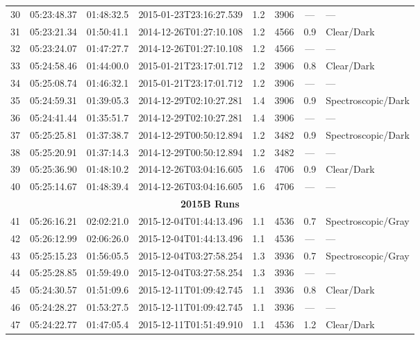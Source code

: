\documentclass[12pt]{article}
\begin{document}
\begin{table}
\begin{center}
\begin{threeparttable}
\begin{tabular}{lccccccl}
	30 & 05:23:48.37 & 01:48:32.5 & 2015-01-23T23:16:27.539 & 1.2  & 3906 & ---      & ---                 \\
	31 & 05:23:21.34 & 01:50:41.1 & 2014-12-26T01:27:10.108 & 1.2  & 4566 & 0.9      & Clear/Dark          \\
	32 & 05:23:24.07 & 01:47:27.7 & 2014-12-26T01:27:10.108 & 1.2  & 4566 & ---      & ---                 \\
	33 & 05:24:58.46 & 01:44:00.0 & 2015-01-21T23:17:01.712 & 1.2  & 3906 & 0.8      & Clear/Dark          \\
	34 & 05:25:08.74 & 01:46:32.1 & 2015-01-21T23:17:01.712 & 1.2  & 3906 & ---      & ---                 \\
	35 & 05:24:59.31 & 01:39:05.3 & 2014-12-29T02:10:27.281 & 1.4  & 3906 & 0.9      & Spectroscopic/Dark  \\
	36 & 05:24:41.44 & 01:35:51.7 & 2014-12-29T02:10:27.281 & 1.4  & 3906 & ---      & ---                 \\
	37 & 05:25:25.81 & 01:37:38.7 & 2014-12-29T00:50:12.894 & 1.2  & 3482 & 0.9      & Spectroscopic/Dark  \\
	38 & 05:25:20.91 & 01:37:14.3 & 2014-12-29T00:50:12.894 & 1.2  & 3482 & ---      & ---                 \\
	39 & 05:25:36.90 & 01:48:10.2 & 2014-12-26T03:04:16.605 & 1.6  & 4706 & 0.9      & Clear/Dark          \\
	40 & 05:25:14.67 & 01:48:39.4 & 2014-12-26T03:04:16.605 & 1.6  & 4706 & ---      & ---                 \\
	\multicolumn{8}{c}{{\bf 2015B Runs}} \\
	41 & 05:26:16.21 & 02:02:21.0 & 2015-12-04T01:44:13.496 & 1.1  & 4536 & 0.7      & Spectroscopic/Gray  \\
	42 & 05:26:12.99 & 02:06:26.0 & 2015-12-04T01:44:13.496 & 1.1  & 4536 & ---      & ---                 \\
	43 & 05:25:15.23 & 01:56:05.5 & 2015-12-04T03:27:58.254 & 1.3  & 3936 & 0.7      & Spectroscopic/Gray  \\
	44 & 05:25:28.85 & 01:59:49.0 & 2015-12-04T03:27:58.254 & 1.3  & 3936 & ---      & ---                 \\
	45 & 05:24:30.57 & 01:51:09.6 & 2015-12-11T01:09:42.745 & 1.1  & 3936 & 0.8      & Clear/Dark          \\
	46 & 05:24:28.27 & 01:53:27.5 & 2015-12-11T01:09:42.745 & 1.1  & 3936 & ---      & ---                 \\
	47 & 05:24:22.77 & 01:47:05.4 & 2015-12-11T01:51:49.910 & 1.1  & 4536 & 1.2      & Clear/Dark          \\

\end{tabular}
\end{threeparttable}
\end{center}
\end{table}
\end{document}
